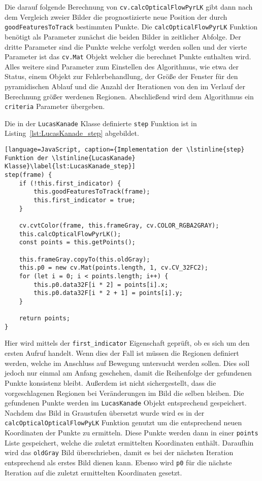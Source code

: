 Die darauf folgende Berechnung von \lstinline{cv.calcOpticalFlowPyrLK} gibt dann nach dem Vergleich zweier Bilder die prognostizierte neue Position der durch \lstinline{goodFeaturesToTrack} bestimmten Punkte.
Die \lstinline{calcOpticalFlowPyrLK} Funktion benötigt als Parameter zunächst die beiden Bilder in zeitlicher Abfolge.
Der dritte Parameter sind die Punkte welche verfolgt werden sollen und der vierte Parameter ist das \lstinline{cv.Mat} Objekt welcher die berechnet Punkte enthalten wird.
Alles weitere sind Parameter zum Einstellen des Algorithmus, wie etwa der Status, einem Objekt zur Fehlerbehandlung, der Größe der Fenster für den pyramidischen Ablauf und die Anzahl der Iterationen von den im Verlauf der Berechnung größer werdenen Regionen.
Abschließend wird dem Algorithmus ein \lstinline{criteria} Parameter übergeben. %

Die in der \lstinline{LucasKanade} Klasse definierte \lstinline{step} Funktion ist in Listing~\ref{lst:LucasKanade_step} abgebildet.

\begin{lstlisting}[language=JavaScript, caption={Implementation der \lstinline{step} Funktion der \lstinline{LucasKanade} Klasse}\label{lst:LucasKanade_step}]
step(frame) {
    if (!this.first_indicator) {
        this.goodFeaturesToTrack(frame);
        this.first_indicator = true;
    }

    cv.cvtColor(frame, this.frameGray, cv.COLOR_RGBA2GRAY);
    this.calcOpticalFlowPyrLK();
    const points = this.getPoints();

    this.frameGray.copyTo(this.oldGray);
    this.p0 = new cv.Mat(points.length, 1, cv.CV_32FC2);
    for (let i = 0; i < points.length; i++) {
        this.p0.data32F[i * 2] = points[i].x;
        this.p0.data32F[i * 2 + 1] = points[i].y;
    }

    return points;
}
\end{lstlisting}

Hier wird mittels der \lstinline{first_indicator} Eigenschaft geprüft, ob es sich um den ersten Aufruf handelt.
Wenn dies der Fall ist müssen die Regionen definiert werden, welche im Anschluss auf Bewegung untersucht werden sollen.
Dies soll jedoch nur einmal am Anfang geschehen, damit die Reihenfolge der gefundenen Punkte konsistenz bleibt.
Außerdem ist nicht sichergestellt, dass die vorgeschlagenen Regionen bei Veränderungen im Bild die selben bleiben.
Die gefundenen Punkte werden im \lstinline{LucasKanade} Objekt entsprechend gespeichert.
Nachdem das Bild in Graustufen übersetzt wurde wird es in der \lstinline{calcOpticalOpticalFlowPyLK} Funktion genutzt um die entsprechend neuen Koordinaten der Punkte zu ermitteln.
Diese Punkte werden dann in einer \lstinline{points} Liste gespeichert, welche die zuletzt ermittelten Koordinaten enthält.
Daraufhin wird das \lstinline{oldGray} Bild überschrieben, damit es bei der nächsten Iteration entsprechend als erstes Bild dienen kann.
Ebenso wird \lstinline{p0} für die nächste Iteration auf die zuletzt ermittelten Koordinaten gesetzt.

